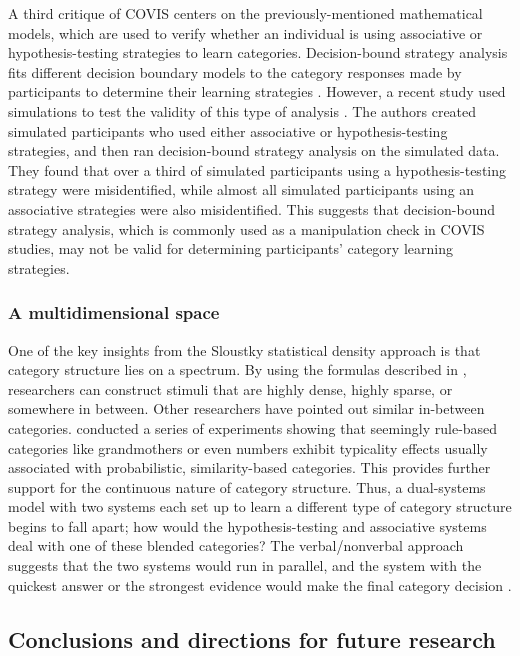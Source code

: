 \documentclass[../dissertation.tex]{subfiles}
\begin{document}
	A third critique of COVIS centers on the previously-mentioned mathematical models, which are used to verify whether an individual is using associative or hypothesis-testing strategies to learn categories. Decision-bound strategy analysis fits different decision boundary models to the category responses made by participants to determine their learning strategies \citep{Maddox1993}. However, a recent study used simulations to test the validity of this type of analysis \citep{Edmunds2018}. The authors created simulated participants who used either associative or hypothesis-testing strategies, and then ran decision-bound strategy analysis on the simulated data. They found that over a third of simulated participants using a hypothesis-testing strategy were misidentified, while almost all simulated participants using an associative strategies were also misidentified. This suggests that decision-bound strategy analysis, which is commonly used as a manipulation check in COVIS studies, may not be valid for determining participants' category learning strategies. \par
	
\subsubsection{A multidimensional space}

One of the key insights from the Sloustky statistical density approach is that category structure lies on a spectrum. By using the formulas described in \citet{Sloutsky2010}, researchers can construct stimuli that are highly dense, highly sparse, or somewhere in between. Other researchers have pointed out similar in-between categories. \citet{Lupyan2013a} conducted a series of experiments showing that seemingly rule-based categories like grandmothers or even numbers exhibit typicality effects usually associated with probabilistic, similarity-based categories. This provides further support for the continuous nature of category structure. Thus, a dual-systems model with two systems each set up to learn a different type of category structure begins to fall apart; how would the hypothesis-testing and associative systems deal with one of these blended categories?  The verbal/nonverbal approach suggests that the two systems would run in parallel, and the system with the quickest answer or the strongest evidence would make the final category decision \citep{Minda2010}. 

\subsection{Conclusions and directions for future research}
\end{document}
